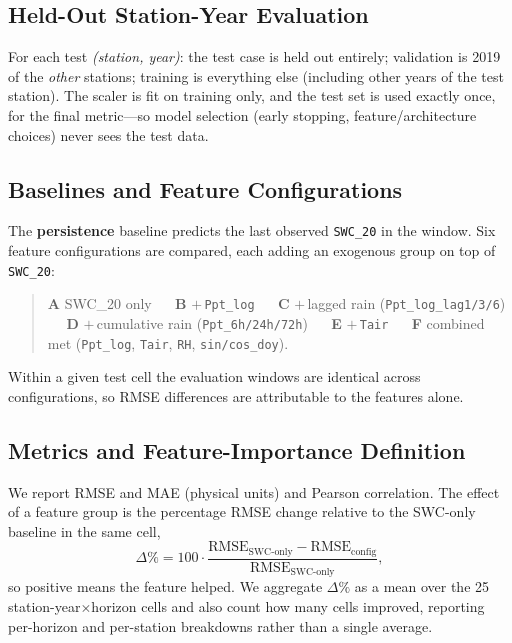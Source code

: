 \documentclass[11pt]{article}
\begin{document}
\subsection{Held-Out Station-Year Evaluation}

For each test \emph{(station, year)}: the test case is held out entirely;
validation is 2019 of the \emph{other} stations; training is everything else
(including other years of the test station). The scaler is fit on training only,
and the test set is used exactly once, for the final metric---so model selection
(early stopping, feature/architecture choices) never sees the test data.

\subsection{Baselines and Feature Configurations}

The \textbf{persistence} baseline predicts the last observed \texttt{SWC\_20} in
the window. Six feature configurations are compared, each adding an exogenous
group on top of \texttt{SWC\_20}:
\begin{quote}
\textbf{A} SWC\_20 only ~\textbar~ \textbf{B} $+$\,\texttt{Ppt\_log} ~\textbar~
\textbf{C} $+$\,lagged rain (\texttt{Ppt\_log\_lag1/3/6}) ~\textbar~
\textbf{D} $+$\,cumulative rain (\texttt{Ppt\_6h/24h/72h}) ~\textbar~
\textbf{E} $+$\,\texttt{Tair} ~\textbar~
\textbf{F} combined met (\texttt{Ppt\_log}, \texttt{Tair}, \texttt{RH},
\texttt{sin/cos\_doy}).
\end{quote}
Within a given test cell the evaluation windows are identical across
configurations, so RMSE differences are attributable to the features alone.

\subsection{Metrics and Feature-Importance Definition}

We report RMSE and MAE (physical units) and Pearson correlation. The effect of a
feature group is the percentage RMSE change relative to the SWC-only baseline in
the same cell,
\begin{equation}
\Delta\% = 100\cdot\frac{\text{RMSE}_{\text{SWC-only}} - \text{RMSE}_{\text{config}}}
{\text{RMSE}_{\text{SWC-only}}},
\end{equation}
so positive means the feature helped. We aggregate $\Delta\%$ as a mean over the
25 station-year$\times$horizon cells and also count how many cells improved,
reporting per-horizon and per-station breakdowns rather than a single average.
\end{document}
